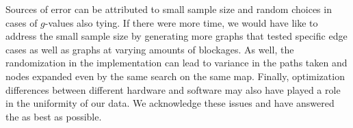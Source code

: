 \documentclass[a4paper,12pt]{article}
\begin{document}
Sources of error can be attributed to small sample size and random choices in cases of $g$-values also tying. If there were more time, we would have like to address the small sample size by generating more graphs that tested specific edge cases as well as graphs at varying amounts of blockages. As well, the randomization in the implementation can lead to variance in the paths taken and nodes expanded even by the same search on the same map. Finally, optimization differences between different hardware and software may also have played a role in the uniformity of our data. We acknowledge these issues and have answered the as best as possible. 
\end{document}

